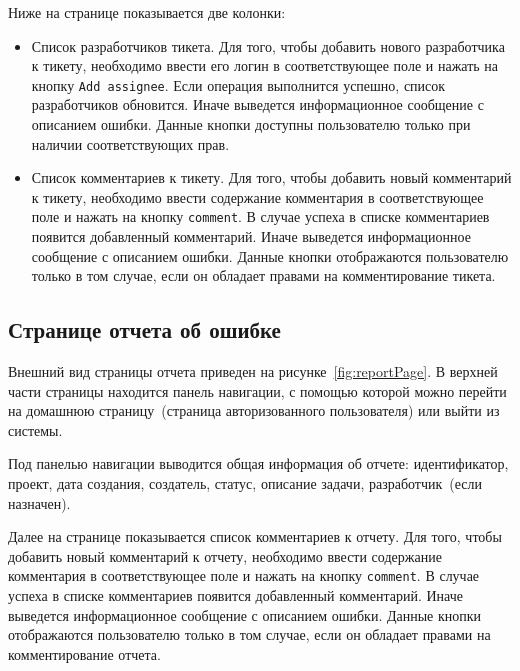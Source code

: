 Ниже на странице показывается две колонки:
\begin{itemize}
	\item Список разработчиков тикета. Для того, чтобы добавить нового разработчика к тикету, необходимо ввести его логин в соответствующее поле и нажать на кнопку \texttt{Add assignee}. Если операция выполнится успешно, список разработчиков обновится. Иначе выведется информационное сообщение с описанием ошибки. Данные кнопки доступны пользователю только при наличии соответствующих прав.
	
	\item Список комментариев к тикету. Для того, чтобы добавить новый комментарий к тикету, необходимо ввести содержание комментария в соответствующее поле и нажать на кнопку \texttt{comment}. В случае успеха в списке комментариев появится добавленный комментарий. Иначе выведется информационное сообщение с описанием ошибки. Данные кнопки отображаются пользователю только в том случае, если он обладает правами на комментирование тикета.
\end{itemize}

\subsection{Странице отчета об ошибке}
Внешний вид страницы отчета приведен на рисунке~\ref{fig:reportPage}. В верхней части страницы находится панель навигации, с помощью которой можно перейти на домашнюю страницу~(страница авторизованного пользователя) или выйти из системы. 

Под панелью навигации выводится общая информация об отчете: идентификатор, проект, дата создания, создатель, статус, описание задачи, разработчик~(если назначен).

Далее на странице показывается список комментариев к отчету. Для того, чтобы добавить новый комментарий к отчету, необходимо ввести содержание комментария в соответствующее поле и нажать на кнопку \texttt{comment}. В случае успеха в списке комментариев появится добавленный комментарий. Иначе выведется информационное сообщение с описанием ошибки. Данные кнопки отображаются пользователю только в том случае, если он обладает правами на комментирование отчета.

